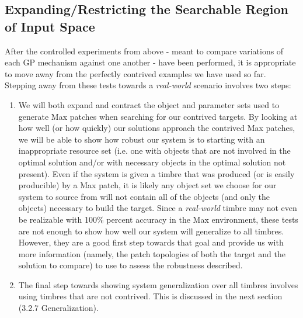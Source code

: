 \documentclass[a4paper,12pt]{report} 	%
\numberwithin{figure}{chapter}
\numberwithin{table}{chapter}
\numberwithin{equation}{chapter}
\begin{document}
\begin{flushleft}
\subsection{Expanding/Restricting the Searchable Region of Input Space}

After the controlled experiments from above - meant to compare variations of each GP mechanism against one another - have been performed, it is appropriate to move away from the perfectly contrived examples we have used so far. Stepping away from these tests towards a \emph{real-world} scenario involves two steps:

\begin{enumerate}
\item We will both expand and contract the object and parameter sets used to generate Max patches when searching for our contrived targets. By looking at how well (or how quickly) our solutions approach the contrived Max patches, we will be able to show how robust our system is to starting with an inappropriate resource set (i.e. one with objects that are not involved in the optimal solution and/or with necessary objects in the optimal solution not present). Even if the system is given a timbre that was produced (or is easily producible) by a Max patch, it is likely any object set we choose for our system to source from will not contain all of the objects (and only the objects) necessary to build the target. Since a \emph{real-world} timbre may not even be realizable with 100\% percent accuracy in the Max environment, these tests are not enough to show how well our system will generalize to all timbres. However, they are a good first step towards that goal and provide us with more information (namely, the patch topologies of both the target and the solution to compare) to use to assess the robustness described.
\item The final step towards showing system generalization over all timbres involves using timbres that are not contrived. This is discussed in the next section (3.2.7 Generalization).
\end{enumerate}


\end{flushleft}
\end{document}
